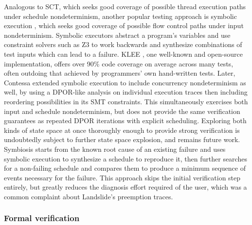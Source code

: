 Analogous to SCT,
which seeks good coverage of possible thread execution paths under schedule nondeterminism,
another popular testing approach is symbolic execution \cite{symbolic-execution},
which seeks good coverage of possible flow control paths under input nondeterminism.
Symbolic executors
abstract a program's variables and use constraint solvers such as Z3 \cite{z3}
to work backwards and synthesize combinations of test inputs which can lead to a failure.
%
KLEE \cite{klee}, one well-known and open-source implementation,
offers over 90\% code coverage on average across many tests,
often outdoing that achieved by programmers' own hand-written tests.
%
Later, Contessa \cite{contessa} extended symbolic execution to include concurrency nondeterminism as well,
by using a DPOR-like analysis on individual execution traces
then including reordering possibilities in its SMT constraints.
This simultaneously exercises both input and schedule nondeterminism,
but does not provide the same verification guarantees as repeated DPOR iterations with explicit scheduling.
Exploring both kinds of state space at once thoroughly enough to provide strong verification
is undoubtedly subject to further state space explosion,
and remains future work.
%
Symbiosis \cite{symbiosis} starts from the known root cause of an existing failure
and uses symbolic execution to synthesize a schedule to reproduce it,
then further searches for a non-failing schedule and compares them to produce
a minimum sequence of events necessary for the failure.
This approach skips the initial verification step entirely,
but greatly reduces the diagnosis effort required of the user,
which was a common complaint about Landslide's preemption traces.

\subsubsection{Formal verification}

